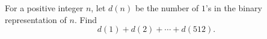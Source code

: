 For a positive integer $n$, let $d(n)$ be the number of $1$'s in the binary representation of $n$. Find
\[d(1)+d(2)+\cdots+d(512).\]
